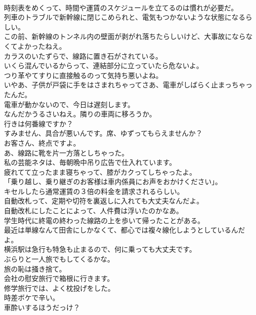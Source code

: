 \documentclass[8pt]{extreport}
\begin{document}
\begin{CJK}{UTF8}{min}
\\	時刻表をめくって、時間や運賃のスケジュールを立てるのは慣れが必要だ。	
\\	列車のトラブルで新幹線に閉じこめられと、電気もつかないような状態になるらしい。	
\\	この前、新幹線のトンネル内の壁面が剥がれ落ちたらしいけど、大事故にならなくてよかったねえ。	
\\	カラスのいたずらで、線路に置き石がされている。	
\\	いくら混んでいるからって、連結部分に立っていたら危ないよ。	
\\	つり革やてすりに直接触るのって気持ち悪いよね。	
\\	いやあ、子供が戸袋に手をはさまれちゃってさあ、電車がしばらく止まっちゃったんだ。	
\\	電車が動かないので、今日は遅刻します。	
\\	なんだかうるさいねえ。隣りの車両に移ろうか。	
\\	行きは何番線ですか？	
\\	すみません、具合が悪いんです。席、ゆずってもらえませんか？	
\\	お客さん、終点ですよ。	
\\	あ、線路に靴を片一方落としちゃった。	
\\	私の芸能ネタは、毎朝晩中吊り広告で仕入れています。	
\\	疲れてて立ったまま寝ちゃって、膝がカクってしちゃったよ。	
\\	「乗り越し、乗り継ぎのお客様は車内係員にお声をおかけください」。	
\\	キセルしたら通常運賃の３倍の料金を請求されるらしい。	
\\	自動改札って、定期や切符を裏返しに入れても大丈夫なんだよ。	
\\	自動改札にしたことによって、人件費は浮いたのかなあ。	
\\	学生時代に終電の終わった線路の上を歩いて帰ったことがある。	
\\	最近は単線なんて田舎にしかなくて、都心では複々線化しようとしているんだよ。	
\\	横浜駅は急行も特急も止まるので、何に乗っても大丈夫です。	
\\	ぶらりと一人旅でもしてくるかな。	
\\	旅の恥は掻き捨て。	
\\	会社の慰安旅行で箱根に行きます。	
\\	修学旅行では、よく枕投げをした。	
\\	時差ボケで辛い。	
\\	車酔いするほうだっけ？	

\end{CJK}
\end{document}
